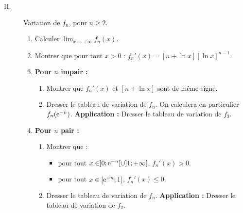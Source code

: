 \begin{description}
\begin{description}
                        \item[II. ]
                              Variation de $f_n$, pour $n \geq 2$.
                              \begin{enumerate}
                                    \item Calculer $\displaystyle{\lim_{x \rightarrow +\infty} f_n (x) }$.
                                    \item Montrer que pour tout $x > 0$ : $f_n ' (x) = [n + \ln x] [\ln x]^{n-1}$.
                                    \item \textbf{Pour $n$ impair :} 
                                          \begin{enumerate}
                                                \item Montrer que $f_n '(x)$ et $[n + \ln x]$ sont de m\^eme signe.
                                                \item Dresser le tableau de variation de $f_n$.
                                                      On calculera en particulier $f_n (\mathrm{e}^{-n})$.	\newline
				                                          \textbf{Application :} Dresser le tableau de variation de $f_3$.
                                          \end{enumerate}
                                    \item \textbf{Pour $n$ pair :}
                                          \begin{enumerate}
                                                \item Montrer que : 
                                                      \begin{itemize}
                                                            \item pour tout $x\in ]0;\mathrm{e}^{-n}[ \cup ]1;+\infty[$, $f_n'(x)>0$.
                                                            \item pour tout $x\in [\mathrm{e}^{-n};1]$, $f_n'(x) \leq 0$.
                                                      \end{itemize}
                                                \item Dresser le tableau de variation de $f_n$.	\newline
				                                          \textbf{Application :} Dresser le tableau de variation de $f_2$.
                                          \end{enumerate}

\end{enumerate}
\end{description}
\end{description}
